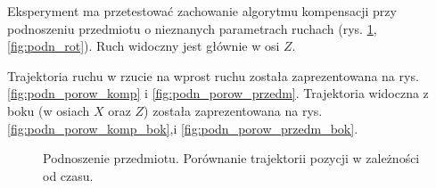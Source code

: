 Eksperyment ma przetestować zachowanie algorytmu kompensacji przy podnoszeniu przedmiotu o nieznanych parametrach ruchach (rys. \ref{fig:podn_a}, \ref{fig:podn_rot}). Ruch widoczny jest głównie w osi $Z$.

Trajektoria ruchu w rzucie na wprost ruchu została zaprezentowana na rys. \ref{fig:podn_porow_komp} i \ref{fig:podn_porow_przedm}. Trajektoria widoczna z boku (w osiach $X$ oraz $Z$) została zaprezentowana na rys. \ref{fig:podn_porow_komp_bok},i \ref{fig:podn_porow_przedm_bok}.


\begin{figure}[H]
	\centering
	\hfill
	

	\caption{Podnoszenie przedmiotu. Porównanie trajektorii pozycji w zależności od czasu.}
	\label{fig:podn_a}

\end{figure}

